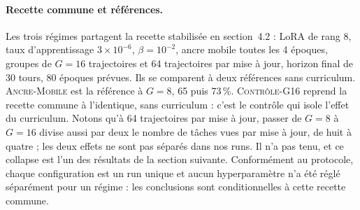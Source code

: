 \documentclass[11pt,a4paper]{article}
\begin{document}
\paragraph{Recette commune et références.} Les trois régimes partagent la recette stabilisée en section~4.2 : LoRA de rang 8, taux d'apprentissage $3 \times 10^{-6}$, $\beta = 10^{-2}$, ancre mobile toutes les 4 époques, groupes de $G=16$ trajectoires et 64 trajectoires par mise à jour, horizon final de 30 tours, 80 époques prévues. Ils se comparent à deux références sans curriculum. \textsc{Ancre-Mobile} est la référence à $G=8$, 65 puis 73\,\%. \textsc{Contrôle-G16} reprend la recette commune à l'identique, sans curriculum : c'est le contrôle qui isole l'effet du curriculum. Notons qu'à 64 trajectoires par mise à jour, passer de $G=8$ à $G=16$ divise aussi par deux le nombre de tâches vues par mise à jour, de huit à quatre ; les deux effets ne sont pas séparés dans nos runs. Il n'a pas tenu, et ce collapse est l'un des résultats de la section suivante. Conformément au protocole, chaque configuration est un run unique et aucun hyperparamètre n'a été réglé séparément pour un régime : les conclusions sont conditionnelles à cette recette commune.
\end{document}

